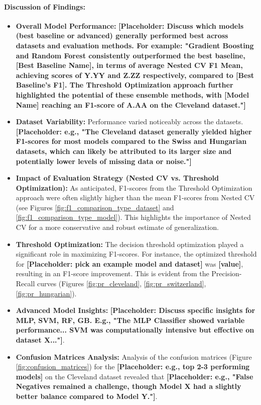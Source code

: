 \documentclass{article}
\begin{document}
\paragraph{Discussion of Findings:}
\begin{itemize}
    \item \textbf{Overall Model Performance:} \textbf{[Placeholder: Discuss which models (best baseline or advanced) generally performed best across datasets and evaluation methods. For example: "Gradient Boosting and Random Forest consistently outperformed the best baseline, [Best Baseline Name], in terms of average Nested CV F1 Mean, achieving scores of Y.YY and Z.ZZ respectively, compared to [Best Baseline's F1]. The Threshold Optimization approach further highlighted the potential of these ensemble methods, with [Model Name] reaching an F1-score of A.AA on the Cleveland dataset."]}
    \item \textbf{Dataset Variability:} Performance varied noticeably across the datasets. \textbf{[Placeholder: e.g., "The Cleveland dataset generally yielded higher F1-scores for most models compared to the Swiss and Hungarian datasets, which can likely be attributed to its larger size and potentially lower levels of missing data or noise."]}
    \item \textbf{Impact of Evaluation Strategy (Nested CV vs. Threshold Optimization):} As anticipated, F1-scores from the Threshold Optimization approach were often slightly higher than the mean F1-scores from Nested CV (see Figures \ref{fig:f1_comparison_type_dataset} and \ref{fig:f1_comparison_type_model}). This highlights the importance of Nested CV for a more conservative and robust estimate of generalization.
    \item \textbf{Threshold Optimization:} The decision threshold optimization played a significant role in maximizing F1-scores. For instance, the optimized threshold for \textbf{[Placeholder: pick an example model and dataset]} was \textbf{[value]}, resulting in an F1-score improvement. This is evident from the Precision-Recall curves (Figures \ref{fig:pr_cleveland}, \ref{fig:pr_switzerland}, \ref{fig:pr_hungarian}).
    \item \textbf{Advanced Model Insights:} \textbf{[Placeholder: Discuss specific insights for MLP, SVM, RF, GB. E.g., "The MLP Classifier showed variable performance... SVM was computationally intensive but effective on dataset X..."]}.
    \item \textbf{Confusion Matrices Analysis:} Analysis of the confusion matrices (Figure \ref{fig:confusion_matrices}) for the \textbf{[Placeholder: e.g., top 2-3 performing models]} on the Cleveland dataset revealed that \textbf{[Placeholder: e.g., "False Negatives remained a challenge, though Model X had a slightly better balance compared to Model Y."]}.
\end{itemize}
\end{document}
